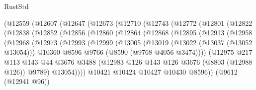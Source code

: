 \begin{lexlean}{RustStd}
\begin{coremodule}
          (@12559
            (@12607
              (@12647
                (@12673
                  (@12710
                    (@12743
                      (@12772
                        (@12801
                          (@12822
                            (@12838
                              (@12852
                                (@12856
                                  (@12860
                                    (@12864
                                      (@12868
                                        (@12895
                                          (@12913
                                            (@12958
                                              (@12968
                                                (@12973
                                                  (@12993
                                                    (@12999
                                                      (@13005
                                                        (@13019
                                                          (@13022 (@13037 (@13052 @13054)))
                                                          @10360
                                                          @8596
                                                          @9766
                                                          (@8590 (@9768 @4056 @3474))))
                                                      (@12975
                                                        @217
                                                        @113
                                                        @143
                                                        @44
                                                        @3676
                                                        @3488
                                                        (@12983
                                                          @126
                                                          @143
                                                          @126
                                                          @3676
                                                          (@8803 (@12988 @126))
                                                          @9789)
                                                        @13054))))
                                                @10421
                                                @10424
                                                @10427
                                                @10430
                                                @8596))
                                            (@9612 (@12941 @96))

\end{coremodule}
\end{lexlean}
